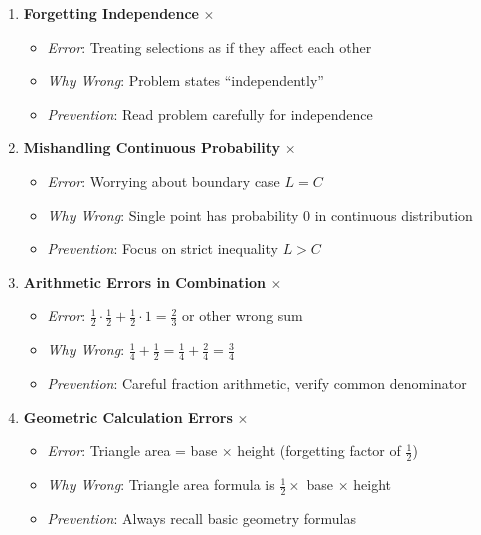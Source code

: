 \documentclass[]{article}
\begin{document}
\begin{solutionbox}
\begin{enumerate}
    \item \textbf{Forgetting Independence} {\color{red}$\times$}
    \begin{itemize}
        \item \textit{Error}: Treating selections as if they affect each other
        \item \textit{Why Wrong}: Problem states ``independently''
        \item \textit{Prevention}: Read problem carefully for independence
    \end{itemize}
    
    \item \textbf{Mishandling Continuous Probability} {\color{red}$\times$}
    \begin{itemize}
        \item \textit{Error}: Worrying about boundary case $L = C$
        \item \textit{Why Wrong}: Single point has probability 0 in continuous distribution
        \item \textit{Prevention}: Focus on strict inequality $L > C$
    \end{itemize}
    
    \item \textbf{Arithmetic Errors in Combination} {\color{red}$\times$}
    \begin{itemize}
        \item \textit{Error}: $\frac{1}{2} \cdot \frac{1}{2} + \frac{1}{2} \cdot 1 = \frac{2}{3}$ or other wrong sum
        \item \textit{Why Wrong}: $\frac{1}{4} + \frac{1}{2} = \frac{1}{4} + \frac{2}{4} = \frac{3}{4}$
        \item \textit{Prevention}: Careful fraction arithmetic, verify common denominator
    \end{itemize}
    
    \item \textbf{Geometric Calculation Errors} {\color{red}$\times$}
    \begin{itemize}
        \item \textit{Error}: Triangle area = base $\times$ height (forgetting factor of $\frac{1}{2}$)
        \item \textit{Why Wrong}: Triangle area formula is $\frac{1}{2} \times$ base $\times$ height
        \item \textit{Prevention}: Always recall basic geometry formulas
    \end{itemize}
\end{enumerate}


\end{solutionbox}
\end{document}
